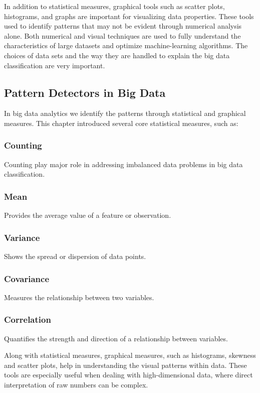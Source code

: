 \documentclass[conference,12pt]{IEEEtran}
\begin{document}
In addition to statistical measures, graphical tools such as scatter plots, histograms, and graphs are important for visualizing data properties. These tools used to identify patterns that may not be evident through numerical analysis alone. Both numerical and visual techniques are used to fully understand the characteristics of large datasets and optimize machine-learning algorithms. The choices of data sets and the way they are handled to explain the big data classification are very important.


\subsection{Pattern Detectors in Big Data}
In big data analytics we identify the patterns through statistical and graphical measures. This chapter introduced several core statistical measures, such as:
\subsubsection{Counting} Counting play major role in addressing imbalanced data problems in big data classification.
\subsubsection{Mean} Provides the average value of a feature or observation.
\subsubsection{Variance} Shows the spread or dispersion of data points.
\subsubsection{Covariance} Measures the relationship between two variables.
\subsubsection{Correlation} Quantifies the strength and direction of a relationship between variables.

Along with statistical measures, graphical measures, such as histograms, skewness and scatter plots, help in understanding the visual patterns within data. These tools are especially useful when dealing with high-dimensional data, where direct interpretation of raw numbers can be complex.
\end{document}

